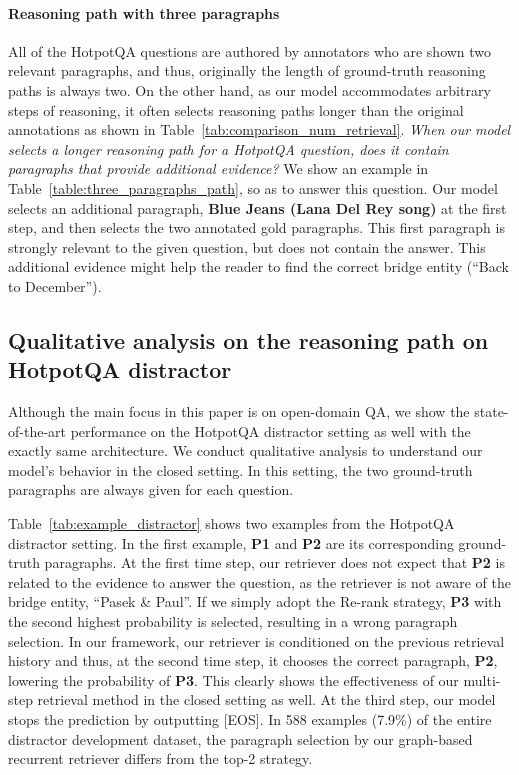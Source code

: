 \paragraph{Reasoning path with three paragraphs}
All of the HotpotQA questions are authored by annotators who are shown two relevant paragraphs, and thus, originally the length of ground-truth reasoning paths is always two. 
On the other hand, as our model accommodates arbitrary steps of reasoning, it often selects reasoning paths longer than the original annotations as shown in Table~\ref{tab:comparison_num_retrieval}. 
{\it When our model selects a longer reasoning path for a HotpotQA question, does it contain paragraphs that provide additional evidence?
}
We show an example in Table~\ref{table:three_paragraphs_path}, so as to answer this question.
Our model selects an additional paragraph, {\bf Blue Jeans (Lana Del Rey song)} at the first step, and then selects the two annotated gold paragraphs. 
This first paragraph is strongly relevant to the given question, but does not contain the answer. This additional evidence might help the reader to find the correct bridge entity (``Back to December'').

\subsection{Qualitative analysis on the reasoning path on HotpotQA distractor}
Although the main focus in this paper is on open-domain QA, we show the state-of-the-art performance on the HotpotQA distractor setting as well with the exactly same architecture. 
We conduct qualitative analysis to understand our model's behavior in the closed setting.
In this setting, the two ground-truth paragraphs are always given for each question.

Table~\ref{tab:example_distractor} shows two examples from the HotpotQA distractor setting. 
In the first example, {\bf P1} and {\bf P2} are its corresponding ground-truth paragraphs.
At the first time step, our retriever does not expect that {\bf P2} is related to the evidence to answer the question, as the retriever is not aware of the bridge entity, ``Pasek \& Paul''.
If we simply adopt the Re-rank strategy, {\bf P3} with the second highest probability is selected, resulting in a wrong paragraph selection. 
In our framework, our retriever is conditioned on the previous retrieval history and thus, at the second time step, it chooses the correct paragraph, {\bf P2}, lowering the probability of {\bf P3}.
This clearly shows the effectiveness of our multi-step retrieval method in the closed setting as well.
At the third step, our model stops the prediction by outputting [EOS].
In 588 examples (7.9\%) of the entire distractor development dataset, the paragraph selection by our graph-based recurrent retriever differs from the top-2 strategy. 

